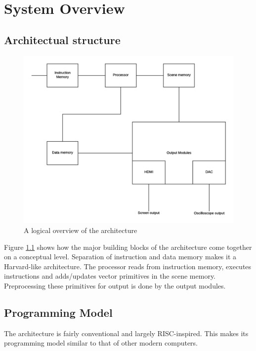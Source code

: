 \chapter{System Overview}



\section{Architectual structure}

\begin{figure}[h!]
    \includegraphics[width=\linewidth]{images/system-overview.png}
    \caption{A logical overview of the \vthreek architecture}
    \label{fig:system-overview}
\end{figure}

Figure \ref{fig:system-overview} shows how the major building blocks of the \vthreek architecture come together on a conceptual level.
Separation of instruction and data memory makes it a Harvard-like architecture.
The processor reads from instruction memory, executes instructions and adds/updates vector primitives in the scene memory.
Preprocessing these primitives for output is done by the output modules.


\section{Programming Model}

The \vthreek architecture is fairly conventional and largely RISC-inspired.
This makes its programming model similar to that of other modern computers.

